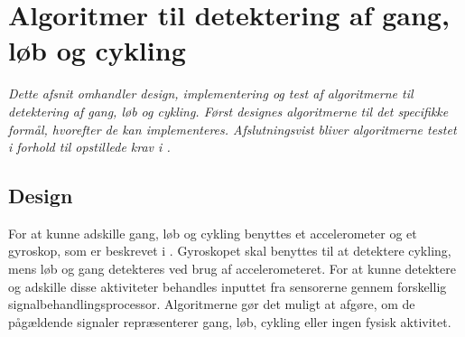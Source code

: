 \section{Algoritmer til detektering af gang, løb og cykling}
\textit{Dette afsnit omhandler design, implementering og test af algoritmerne til detektering af gang, løb og cykling. Først designes algoritmerne til det specifikke formål, hvorefter de kan implementeres. Afslutningsvist bliver algoritmerne testet i forhold til opstillede krav i .} 

\subsection{Design}
For at kunne adskille gang, løb og cykling benyttes et accelerometer og et gyroskop, som er beskrevet i . Gyroskopet skal benyttes til at detektere cykling, mens løb og gang detekteres ved brug af accelerometeret. For at kunne detektere og adskille disse aktiviteter behandles inputtet fra sensorerne gennem forskellig signalbehandlingsprocessor. Algoritmerne gør det muligt at afgøre, om de pågældende signaler repræsenterer gang, løb, cykling eller ingen fysisk aktivitet. 

